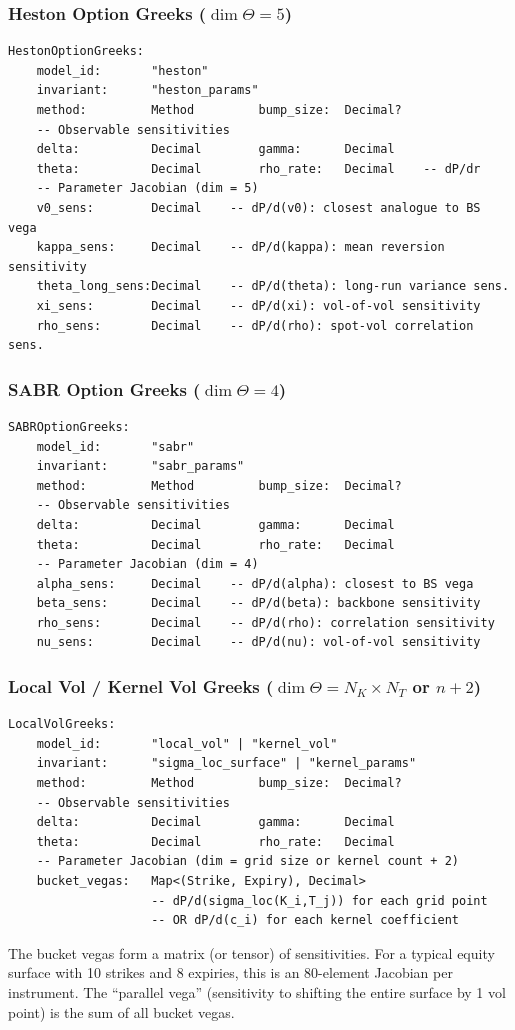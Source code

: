 \documentclass[11pt,a4paper]{article}
\begin{document}
\subsubsection{Heston Option Greeks ($\dim\Theta = 5$)}
\begin{lstlisting}
HestonOptionGreeks:
    model_id:       "heston"
    invariant:      "heston_params"
    method:         Method         bump_size:  Decimal?
    -- Observable sensitivities
    delta:          Decimal        gamma:      Decimal
    theta:          Decimal        rho_rate:   Decimal    -- dP/dr
    -- Parameter Jacobian (dim = 5)
    v0_sens:        Decimal    -- dP/d(v0): closest analogue to BS vega
    kappa_sens:     Decimal    -- dP/d(kappa): mean reversion sensitivity
    theta_long_sens:Decimal    -- dP/d(theta): long-run variance sens.
    xi_sens:        Decimal    -- dP/d(xi): vol-of-vol sensitivity
    rho_sens:       Decimal    -- dP/d(rho): spot-vol correlation sens.
\end{lstlisting}

\subsubsection{SABR Option Greeks ($\dim\Theta = 4$)}
\begin{lstlisting}
SABROptionGreeks:
    model_id:       "sabr"
    invariant:      "sabr_params"
    method:         Method         bump_size:  Decimal?
    -- Observable sensitivities
    delta:          Decimal        gamma:      Decimal
    theta:          Decimal        rho_rate:   Decimal
    -- Parameter Jacobian (dim = 4)
    alpha_sens:     Decimal    -- dP/d(alpha): closest to BS vega
    beta_sens:      Decimal    -- dP/d(beta): backbone sensitivity
    rho_sens:       Decimal    -- dP/d(rho): correlation sensitivity
    nu_sens:        Decimal    -- dP/d(nu): vol-of-vol sensitivity
\end{lstlisting}

\subsubsection{Local Vol / Kernel Vol Greeks ($\dim\Theta = N_K \times N_T$ or $n+2$)}
\begin{lstlisting}
LocalVolGreeks:
    model_id:       "local_vol" | "kernel_vol"
    invariant:      "sigma_loc_surface" | "kernel_params"
    method:         Method         bump_size:  Decimal?
    -- Observable sensitivities
    delta:          Decimal        gamma:      Decimal
    theta:          Decimal        rho_rate:   Decimal
    -- Parameter Jacobian (dim = grid size or kernel count + 2)
    bucket_vegas:   Map<(Strike, Expiry), Decimal>
                    -- dP/d(sigma_loc(K_i,T_j)) for each grid point
                    -- OR dP/d(c_i) for each kernel coefficient
\end{lstlisting}
The bucket vegas form a matrix (or tensor) of sensitivities.  For a typical equity surface with 10 strikes and 8 expiries, this is an 80-element Jacobian per instrument.  The ``parallel vega'' (sensitivity to shifting the entire surface by 1 vol point) is the sum of all bucket vegas.
\end{document}
